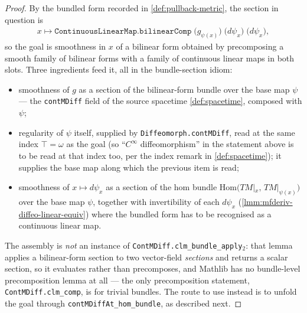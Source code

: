 \begin{proof}
    By the bundled form recorded in \ref{def:pullback-metric}, the section in question is
    \begin{align}
        x \longmapsto \mathtt{ContinuousLinearMap.bilinearComp}\;\big(g_{\psi(x)}\big)\;\big(d\psi_x\big)\;\big(d\psi_x\big),
    \end{align}
    so the goal is smoothness in $x$ of a bilinear form obtained by precomposing a smooth family of bilinear forms with a family of continuous linear maps in both slots. Three ingredients feed it, all in the bundle-section idiom:
    \begin{itemize}
        \item smoothness of $g$ as a section of the bilinear-form bundle over the base map $\psi$ --- the \texttt{contMDiff} field of the source spacetime \ref{def:spacetime}, composed with $\psi$;
        \item regularity of $\psi$ itself, supplied by \texttt{Diffeomorph.contMDiff}, read at the same index $\top = \omega$ as the goal (so ``$C^\infty$ diffeomorphism'' in the statement above is to be read at that index too, per the index remark in \ref{def:spacetime}); it supplies the base map along which the previous item is read;
        \item smoothness of $x \mapsto d\psi_x$ as a section of the hom bundle $\mathrm{Hom}\big(TM|_x,\, TM|_{\psi(x)}\big)$ over the base map $\psi$, together with invertibility of each $d\psi_x$ (\ref{lmm:mfderiv-diffeo-linear-equiv}) where the bundled form has to be recognised as a continuous linear map.
    \end{itemize}
    The assembly is \emph{not} an instance of \texttt{ContMDiff.clm\_bundle\_apply\ensuremath{_2}}: that lemma applies a bilinear-form section to two vector-field \emph{sections} and returns a scalar section, so it evaluates rather than precomposes, and Mathlib has no bundle-level precomposition lemma at all --- the only precomposition statement, \texttt{ContMDiff.clm\_comp}, is for trivial bundles. The route to use instead is to unfold the goal through \texttt{contMDiffAt\_hom\_bundle}, as described next.


\end{proof}
